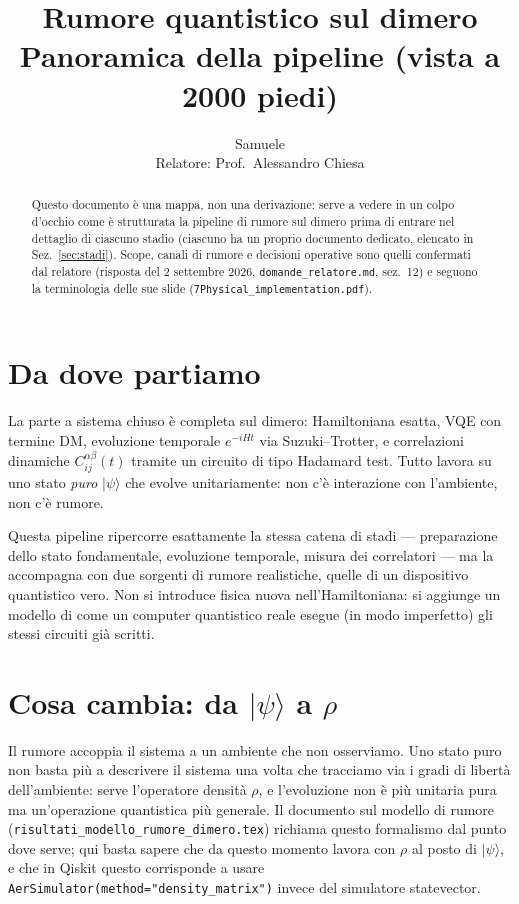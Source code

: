 \documentclass[11pt,a4paper]{article}
\title{Rumore quantistico sul dimero\\
\large Panoramica della pipeline (vista a 2000 piedi)}
\author{Samuele \\ Relatore: Prof.\ Alessandro Chiesa}
\date{}
\newcommand{\ket}[1]{\lvert #1 \rangle}
\begin{document}
\maketitle

\begin{abstract}
\noindent Questo documento è una mappa, non una derivazione: serve a
vedere in un colpo d'occhio come è strutturata la pipeline di rumore sul
dimero prima di entrare nel dettaglio di ciascuno stadio (ciascuno ha un
proprio documento dedicato, elencato in Sez.~\ref{sec:stadi}). Scope,
canali di rumore e decisioni operative sono quelli confermati dal
relatore (risposta del 2 settembre 2026, \texttt{domande\_relatore.md},
sez.~12) e seguono la terminologia delle sue slide
(\texttt{7Physical\_implementation.pdf}).
\end{abstract}

\tableofcontents

\section{Da dove partiamo}

La parte a sistema chiuso è completa sul dimero: Hamiltoniana esatta,
VQE con termine DM, evoluzione temporale $e^{-iHt}$ via
Suzuki--Trotter, e correlazioni dinamiche $C_{ij}^{\alpha\beta}(t)$
tramite un circuito di tipo Hadamard test. Tutto lavora su uno stato
\emph{puro} $\ket{\psi}$ che evolve unitariamente: non c'è interazione
con l'ambiente, non c'è rumore.

Questa pipeline ripercorre esattamente la stessa catena di stadi ---
preparazione dello stato fondamentale, evoluzione temporale, misura dei
correlatori --- ma la accompagna con due sorgenti di rumore realistiche,
quelle di un dispositivo quantistico vero. Non si introduce fisica nuova
nell'Hamiltoniana: si aggiunge un modello di come un computer quantistico
reale esegue (in modo imperfetto) gli stessi circuiti già scritti.

\section{Cosa cambia: da \texorpdfstring{$\ket{\psi}$}{|psi>} a \texorpdfstring{$\rho$}{rho}}

Il rumore accoppia il sistema a un ambiente che non osserviamo. Uno
stato puro non basta più a descrivere il sistema una volta che
tracciamo via i gradi di libertà dell'ambiente: serve l'operatore
densità $\rho$, e l'evoluzione non è più unitaria pura ma un'operazione
quantistica più generale. Il documento sul modello di rumore
(\texttt{risultati\_modello\_\allowbreak rumore\_dimero.tex}) richiama questo
formalismo dal punto dove serve; qui basta sapere che da questo momento
lavora con $\rho$ al posto di $\ket{\psi}$, e che in Qiskit questo
corrisponde a usare
\texttt{AerSimulator(method=\allowbreak"density\_matrix")} invece del
simulatore statevector.
\end{document}
